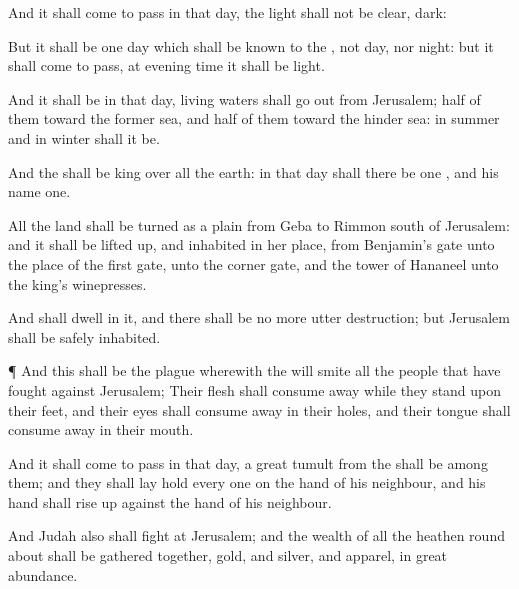 {And it shall come to pass in that
day,
{} the
light shall not be
clear,
{}
dark:

But it shall be
one
day which shall be
known to the
{}, not
day, nor
night: but it shall come to pass,
{} at
evening
time it shall be
light.


\par }{\PP {}And it shall be in that
day,
{}
living
waters shall go
out from
Jerusalem;
half of them toward the
former
sea, and
half of them toward the
hinder
sea: in
summer and in
winter shall it be.

And the
{} shall be
king over all the
earth: in that
day shall there be
one
{}, and his
name
one.

All the
land shall be
turned as a
plain from
Geba to
Rimmon
south of
Jerusalem: and it shall be lifted
up, and
inhabited in her place, from
Benjamin’s
gate unto the
place of the
first
gate, unto the
corner
gate, and
{} the
tower of
Hananeel unto the
king’s
winepresses.

And
{} shall
dwell in it, and there shall be no more utter
destruction; but
Jerusalem shall be
safely
inhabited.


\par }{\PP {}¶ And this shall be the
plague wherewith the
{} will
smite all the
people that have
fought against
Jerusalem; Their
flesh shall consume
away while they
stand upon their
feet, and their
eyes shall consume
away in their
holes, and their
tongue shall consume
away in their
mouth.

And it shall come to pass in that
day,
{} a
great
tumult from the
{} shall be among them; and they shall lay
hold every
one on the
hand of his
neighbour, and his
hand shall rise
up against the
hand of his
neighbour.

And
Judah also shall
fight at
Jerusalem; and the
wealth of all the
heathen round
about shall be gathered
together,
gold, and
silver, and
apparel, in
great
abundance.

}
